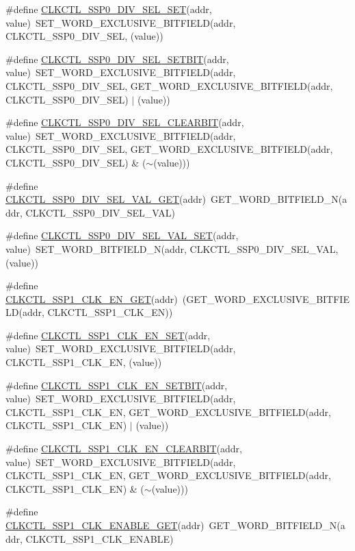 \begin{DoxyCompactItemize}
\item 
\#define \hyperlink{a00544_a6eb6b30cf502e2c354f6e9cadb83ab70}{CLKCTL\_\-SSP0\_\-DIV\_\-SEL\_\-SET}(addr, value)~SET\_\-WORD\_\-EXCLUSIVE\_\-BITFIELD(addr, CLKCTL\_\-SSP0\_\-DIV\_\-SEL, (value))
\item 
\#define \hyperlink{a00544_aa8ea219ed370e29cc47805f34d2bbe01}{CLKCTL\_\-SSP0\_\-DIV\_\-SEL\_\-SETBIT}(addr, value)~SET\_\-WORD\_\-EXCLUSIVE\_\-BITFIELD(addr, CLKCTL\_\-SSP0\_\-DIV\_\-SEL, GET\_\-WORD\_\-EXCLUSIVE\_\-BITFIELD(addr, CLKCTL\_\-SSP0\_\-DIV\_\-SEL) $|$ (value))
\item 
\#define \hyperlink{a00544_a561f40330a078a71e7ec95594f6ceae1}{CLKCTL\_\-SSP0\_\-DIV\_\-SEL\_\-CLEARBIT}(addr, value)~SET\_\-WORD\_\-EXCLUSIVE\_\-BITFIELD(addr, CLKCTL\_\-SSP0\_\-DIV\_\-SEL, GET\_\-WORD\_\-EXCLUSIVE\_\-BITFIELD(addr, CLKCTL\_\-SSP0\_\-DIV\_\-SEL) \& ($\sim$(value)))
\item 
\#define \hyperlink{a00544_a88d584017273da2cf9b569ce08393953}{CLKCTL\_\-SSP0\_\-DIV\_\-SEL\_\-VAL\_\-GET}(addr)~GET\_\-WORD\_\-BITFIELD\_\-N(addr, CLKCTL\_\-SSP0\_\-DIV\_\-SEL\_\-VAL)
\item 
\#define \hyperlink{a00544_a25242322a5a898dea00f378d968b8df2}{CLKCTL\_\-SSP0\_\-DIV\_\-SEL\_\-VAL\_\-SET}(addr, value)~SET\_\-WORD\_\-BITFIELD\_\-N(addr, CLKCTL\_\-SSP0\_\-DIV\_\-SEL\_\-VAL, (value))
\item 
\#define \hyperlink{a00544_ae51db59af93b31c291d0ebdf17aed9f5}{CLKCTL\_\-SSP1\_\-CLK\_\-EN\_\-GET}(addr)~(GET\_\-WORD\_\-EXCLUSIVE\_\-BITFIELD(addr, CLKCTL\_\-SSP1\_\-CLK\_\-EN))
\item 
\#define \hyperlink{a00544_af10240f499414ebf10e60e4c8e8724b7}{CLKCTL\_\-SSP1\_\-CLK\_\-EN\_\-SET}(addr, value)~SET\_\-WORD\_\-EXCLUSIVE\_\-BITFIELD(addr, CLKCTL\_\-SSP1\_\-CLK\_\-EN, (value))
\item 
\#define \hyperlink{a00544_a04d7d49872359913cf3b7665d55b6ae2}{CLKCTL\_\-SSP1\_\-CLK\_\-EN\_\-SETBIT}(addr, value)~SET\_\-WORD\_\-EXCLUSIVE\_\-BITFIELD(addr, CLKCTL\_\-SSP1\_\-CLK\_\-EN, GET\_\-WORD\_\-EXCLUSIVE\_\-BITFIELD(addr, CLKCTL\_\-SSP1\_\-CLK\_\-EN) $|$ (value))
\item 
\#define \hyperlink{a00544_afce356741b9a25aa73cf2bffa7771a8d}{CLKCTL\_\-SSP1\_\-CLK\_\-EN\_\-CLEARBIT}(addr, value)~SET\_\-WORD\_\-EXCLUSIVE\_\-BITFIELD(addr, CLKCTL\_\-SSP1\_\-CLK\_\-EN, GET\_\-WORD\_\-EXCLUSIVE\_\-BITFIELD(addr, CLKCTL\_\-SSP1\_\-CLK\_\-EN) \& ($\sim$(value)))
\item 
\#define \hyperlink{a00544_ad8112be799cb107081a9d215d4477a19}{CLKCTL\_\-SSP1\_\-CLK\_\-ENABLE\_\-GET}(addr)~GET\_\-WORD\_\-BITFIELD\_\-N(addr, CLKCTL\_\-SSP1\_\-CLK\_\-ENABLE)

\end{DoxyCompactItemize}
